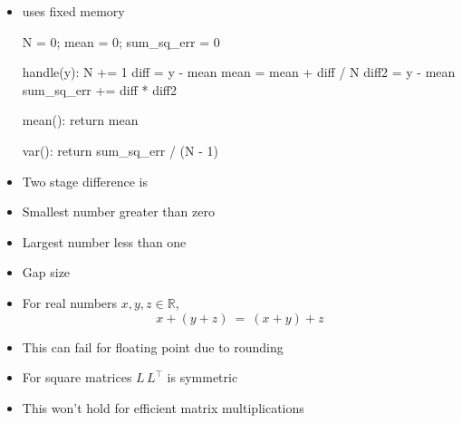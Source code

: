 \documentclass[10pt]{report}
\begin{document}
\begin{itemize}
\item {} uses fixed memory
\begin{stancode}
N = 0;    mean = 0;    sum_sq_err = 0

handle(y):
    N += 1
    diff = y - mean
    mean = mean + diff / N
    diff2 = y - mean
    sum_sq_err += diff * diff2

mean():  return mean

var():  return sum_sq_err / (N - 1)
\end{stancode}
\item Two stage difference is 
\end{itemize}


%
\begin{itemize}
\item Smallest number greater than zero
\item Largest number less than one
\item Gap size 
\end{itemize}


%
\begin{itemize}
\item For real numbers $x, y, z \in \mathbb{R}$,
\[
x + (y + z) \ = \ (x + y) + z
\]
\item This can fail for floating point due to rounding
\item For square matrices $L \, L^{\top}$ is symmetric
\item This won't hold for efficient matrix multiplications
\end{itemize}
\end{document}
